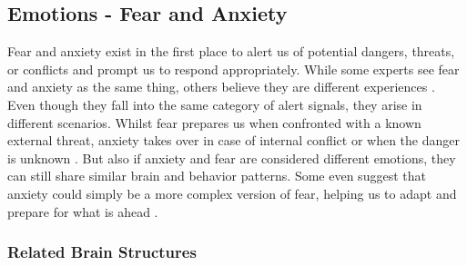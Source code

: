     \subsection{Emotions - Fear and Anxiety}
        Fear and anxiety exist in the first place to alert us of potential dangers, threats, or conflicts and prompt us to respond appropriately. While some experts see fear and anxiety as the same thing, others believe they are different experiences \cite{Steimer.2002}.
        Even though they fall into the same category of alert signals, they arise in different scenarios. Whilst fear prepares us when confronted with a known external threat, anxiety takes over in case of internal conflict or when the danger is unknown \cite{kj.1995}.
        But also if anxiety and fear are considered different emotions, they can still share similar brain and behavior patterns. Some even suggest that anxiety could simply be a more complex version of fear, helping us to adapt and prepare for what is ahead \cite{Barlow.2000}.

    \subsubsection{Related Brain Structures}
        
